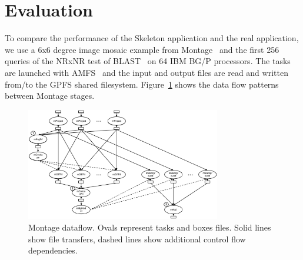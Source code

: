 \documentclass{sig-alternate}
\newcommand{\note}[1]{ {\textcolor{red}    {\bf #1 }}}
\newcommand{\note}[1]{}
\begin{document}
\section{Evaluation} \label{sec:eval}

To compare the performance of the Skeleton application and the real application, we use a 6x6 degree image mosaic
example from Montage~\cite{montage1} and the first 256 queries of the NRxNR test of BLAST~\cite{ParallelBlast} on 64 IBM BG/P processors. 
The tasks are launched with AMFS~\cite{AMFS2013} and the input
and output files are read and written from/to the GPFS shared filesystem. Figure~\ref{fig:Montage} shows the data flow patterns between Montage
stages.

\begin{figure}[h]
\begin{center}
    \includegraphics[width=85mm]{pictures/Montage}
\caption {Montage dataflow. Ovals represent tasks and boxes files. Solid lines show file transfers, dashed lines show additional control flow dependencies.
    \label{fig:Montage}
}
\end{center}
\end{figure}
\end{document}
